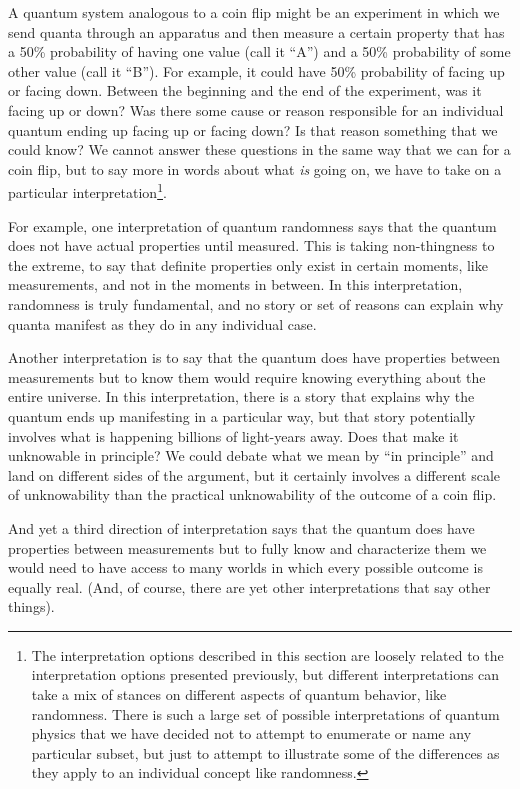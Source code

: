 \documentclass[12pt,onecolumn,preprintnumbers,amsmath,amssymbn,reprint,nofootinbib,superscriptaddress]{revtex4}    %
\begin{document}
A quantum system analogous to a coin flip might be an experiment in which we send quanta through an apparatus and then measure a certain property that has a 50\% probability of having one value (call it ``A'') and a 50\% probability of some other value (call it ``B''). For example, it could have 50\% probability of facing up or facing down.  Between the beginning and the end of the experiment, was it facing up or down?  Was there some cause or reason responsible for an individual quantum ending up facing up or facing down?  Is that reason something that we could know?  We cannot answer these questions in the same way that we can for a coin flip, but to say more in words about what {\em is} going on, we have to take on a particular interpretation\footnote{The interpretation options described in this section are loosely related to the interpretation options presented previously, but different interpretations can take a mix of stances on different aspects of quantum behavior, like randomness.  There is such a large set of possible interpretations of quantum physics that we have decided not to attempt to enumerate or name any particular subset, but just to attempt to illustrate some of the differences as they apply to an individual concept like randomness.}.

For example, one interpretation of quantum randomness says that the quantum does not have actual properties until measured.  This is taking non-thingness to the extreme, to say that definite properties only exist in certain moments, like measurements, and not in the moments in between.  In this interpretation, randomness is truly fundamental, and no story or set of reasons can explain why quanta manifest as they do in any individual case.

Another interpretation is to say that the quantum does have properties between measurements but to know them would require knowing everything about the entire universe.  In this interpretation, there is a story that explains why the quantum ends up manifesting in a particular way, but that story potentially involves what is happening billions of light-years away.  Does that make it unknowable in principle?  We could debate what we mean by ``in principle'' and land on different sides of the argument,  but it certainly involves a different scale of unknowability than the practical unknowability of the outcome of a coin flip.  

And yet a third direction of interpretation says that the quantum does have properties between measurements but to fully know and characterize them we would need to have access to many worlds in which every possible outcome is equally real.   (And, of course, there are yet other interpretations that say other things).  
\end{document}

